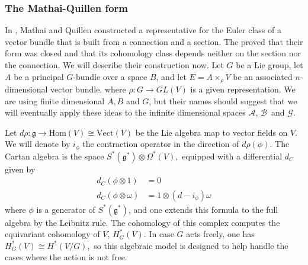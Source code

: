 \documentclass[twoside]{amsart}
\newcommand{\enm}[1]{\ensuremath{#1}}
\renewcommand{\aa}{\enm{\mathcal{A}}}
\newcommand{\bb}{\enm{\mathcal{B}}}
\renewcommand{\gg}{\enm{\mathcal{G}}}
\newcommand{\g}{\enm{\mathfrak{g}}}
\newcommand{\formsij}[2]{\ensuremath{\Omega^{#1}({#2})}}
\begin{document}
\subsubsection{The Mathai-Quillen form}

In \cite{mathaiquillen}, Mathai and Quillen constructed a
representative for the Euler class of a vector bundle that is built
from a
connection and a section.  The proved that their form was closed and
that its cohomology class depends neither on the section nor the
connection.  We will describe their construction now.  Let \( G \) be
a Lie group, let \( A \) be a principal \( G \)-bundle over a space \(
B \), and let \( E = A\times_{\rho}V \) be an associated \( n
\)-dimensional vector bundle, where \( \rho:G\to GL(V) \) is a given
representation.  We are using finite dimensional \( A, B\) and \( G
\), but their names should suggest that we will eventually apply these
ideas to the infinite dimensional spaces \aa, \bb\ and \gg.

Let \( d\rho:\g\to \mathrm{Hom}(V)\cong \mathrm{Vect}(V) \) be the
Lie algebra map to vector fields on \( V \). We will denote by \(
i_{\phi} \) the contraction operator in the direction of \(
d\rho(\phi) \). The Cartan algebra is the space \(
S^{*}(\g^{*})\otimes
\formsij{*}{V}, \) equipped with a differential \( d_{C} \) given by
\begin{align}
    d_{C}(\phi\otimes 1) &= 0 \\
    d_{C}(\phi\otimes\omega) &= 1\otimes (d-i_{\phi})\omega
\end{align}
where \( \phi \) is a generator of \( S^{*}(\g^{*}) \), and one
extends this formula to the full algebra by the Leibnitz rule.  The
cohomology of this complex computes the equivariant cohomology of \( V
\), \( H^{*}_{G}(V). \)  In case \( G \) acts freely, one has \(
H^{*}_{G}(V)\cong H^{*}(V/G), \) so this algebraic model is
designed to help handle the cases where the action is not free.
\end{document}
